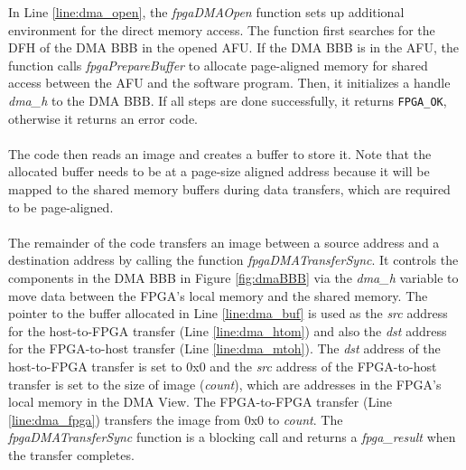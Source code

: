 \documentclass[epsfig,10pt,fullpage]{article}
\begin{document}
\noindent
In Line \ref{line:dma_open}, the \emph{fpgaDMAOpen} function sets up additional environment for the direct memory access. The function first searches for the DFH of the DMA BBB in the opened AFU. If the DMA BBB is in the AFU, the function calls \emph{fpgaPrepareBuffer} to allocate page-aligned memory for shared access between the AFU and the software program. Then, it initializes a handle \emph{dma\_h} to the DMA BBB. If all steps are done successfully, it returns \texttt{FPGA\_OK}, otherwise it returns an error code. \\
 \\
\newpage
The code then reads an image and creates a buffer to store it. Note that the allocated buffer needs to be at a page-size aligned address because it will be mapped to the shared memory buffers during data transfers, which are required to be page-aligned.\\
\\
\noindent
The  remainder of the code transfers an image between a source address and a destination address by calling the function \emph{fpgaDMATransferSync}. It controls the components in the DMA BBB in Figure \ref{fig:dmaBBB} via the \emph{dma\_h} variable to move data between the FPGA's local memory and the shared memory. The pointer to the buffer allocated in Line \ref{line:dma_buf} is used as the \emph{src} address for the host-to-FPGA transfer (Line \ref{line:dma_htom}) and also the \emph{dst} address for the FPGA-to-host transfer (Line \ref{line:dma_mtoh}). The \emph{dst} address of the host-to-FPGA transfer is set to 0x0 and the \emph{src} address of the FPGA-to-host transfer is set to the size of image (\emph{count}), which are addresses in the FPGA's local memory in the DMA View. The FPGA-to-FPGA transfer (Line \ref{line:dma_fpga}) transfers the image from 0x0 to \emph{count}. The \emph{fpgaDMATransferSync} function is a blocking call and returns a \emph{fpga\_result} when the transfer completes. \\
\end{document}
